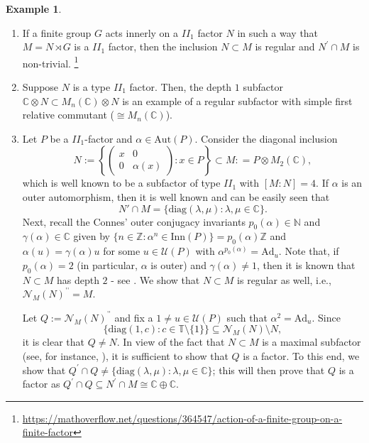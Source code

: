 \documentclass{amsart}
\theoremstyle{definition}
\newtheorem{example}[theorem]{Example}
\theoremstyle{theorem}
\DeclareMathOperator*{\dprime}{\prime \prime}
\newcommand{\C}{\mathbb{C}}
\newcommand{\Z}{\mathbb Z}
\newcommand{\N}{\mathbb N}
\newcommand{\Aut}{\text{Aut}}
\begin{document}
 \begin{example}\label{last-examples}
  \begin{enumerate}
   \item If a finite group $G$ acts innerly on a $II_1$ factor $N$ in
     such a way that $M= N\rtimes G$ is a $II_1$ factor, then the
     inclusion $N\subset M$ is regular and $N^{\prime}\cap M$ is
     non-trivial. \footnote{
     \url{https://mathoverflow.net/questions/364547/action-of-a-finite-group-on-a-finite-factor}}


\item Suppose $N$ is a type $II_1$ factor. Then, the depth $1$
  subfactor $\C\otimes N\subset M_n(\C)\otimes N$ is an example of a
  regular subfactor with simple first relative commutant ($\cong
  M_n(\C)$).
\item Let $P$ be a $II_1$-factor and $\alpha \in \Aut(P)$. Consider
  the diagonal inclusion
  \[
  N:=\left\{\begin{pmatrix}
x & 0 \\ 0 & \alpha(x) 
  \end{pmatrix} : x \in P\right\} \subset M: = P \otimes M_2(\C),
  \]
  which is well known to be a subfactor of type $II_1$ with $[M:N]=
  4$. If $\alpha$ is an outer automorphism, then it is well known and can be easily seen that 
  \[
  N'\cap M =\{\mathrm{diag}(\lambda,\mu) :
  \lambda, \mu \in \C \}.
  \]
  Next, recall the Connes' outer conjugacy invariants $p_0(\alpha)\in
  \N$ and $\gamma (\alpha)\in \C$ given by $\{ n \in \Z: \alpha^n \in
  \mathrm{Inn}(P)\} = p_0(\alpha) \Z$ and $\alpha (u) = \gamma
  (\alpha) u$ for some $u \in \mathcal{U}(P)$ with
  $\alpha^{p_0(\alpha)}=\mathrm{Ad}_u$. Note that, if $p_0(\alpha) =
  2$ (in particular, $\alpha$ is outer) and $\gamma(\alpha) \neq 1$,
  then it is known that $N \subset M$ has depth $2$ - see \cite[$\S
    7$]{NV1}. We show that $N \subset M$ is regular as well, i.e.,
  ${\mathcal{N}_M(N)}^{\dprime}=M$.
  
Let $Q:= {\mathcal{N}_M(N)}^{\dprime}$ and fix a $1\neq u\in
\mathcal{U}(P)$ such that ${\alpha}^2=\mathrm{Ad}_u$.  Since
   \[
\{\mathrm{diag}(1,c): c \in \mathbb{T}\setminus \{1\} \} \subseteq
                {\mathcal{N}}_M(N)\setminus N,
  \]
  it is clear that $Q\neq N$. In view of the fact that $N\subset M$ is
  a maximal subfactor (see, for instance,
  \cite[Theorem 5.4]{TW}), it is sufficient to show that $Q$ is a
  factor. To this end, we show that $Q^{\prime}\cap Q\neq
  \{\mathrm{diag}(\lambda, \mu) : \lambda, \mu \in \C\}$; this will
  then prove that $Q$ is a factor as $Q^{\prime}\cap Q\subseteq
  N^{\prime}\cap M \cong \C\oplus \C$.


\end{enumerate}
\end{example}
\end{document}
